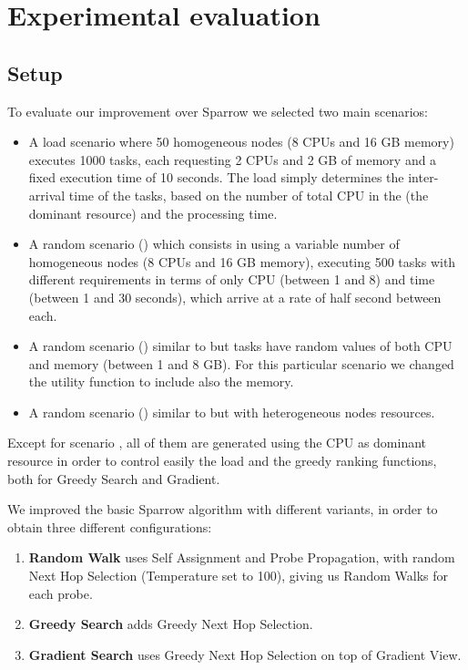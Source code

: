 \documentclass[conference]{IEEEtran}
\begin{document}
\section{Experimental evaluation}\label{sec:Evaluation}

  \subsection{Setup}
  To evaluate our improvement over Sparrow we selected two main scenarios:
  \begin{itemize}

    \item A load scenario where 50 homogeneous nodes (8 CPUs and 16 GB
      memory) executes 1000 tasks, each requesting 2 CPUs and 2 GB of
      memory and a fixed execution time of 10 seconds. The load simply
      determines the inter-arrival time of the tasks, based on the number
      of total CPU in the \dc (the dominant resource) and the processing
      time.

    \item A random scenario () which consists in using  a
      variable number of homogeneous nodes (8 CPUs and 16 GB memory),
      executing 500 tasks with different requirements in terms of only CPU
      (between 1 and 8) and time (between 1 and 30 seconds), which arrive
      at a rate of half second between each.

    \item A random scenario () similar to  but
      tasks have random values of both CPU and memory (between 1 and 8
      GB). For this particular scenario we changed the utility function to
      include also the memory.

    \item A random scenario () similar to  but
      with heterogeneous nodes resources.

  \end{itemize}

  Except for scenario , all of them are generated using the
  CPU as dominant resource in order to control easily the load and the
  greedy ranking functions, both for Greedy Search and Gradient.

  We improved the basic Sparrow algorithm with different variants, in
  order to obtain three different configurations:
  \begin{enumerate}

    \item \textbf{Random Walk} uses Self Assignment and Probe Propagation,
      with random Next Hop Selection (Temperature set to 100), giving us
      Random Walks for each probe. 

    \item \textbf{Greedy Search} adds Greedy Next Hop Selection.

    \item \textbf{Gradient Search} uses Greedy Next Hop Selection on top
      of Gradient View.

  \end{enumerate}
\end{document}
